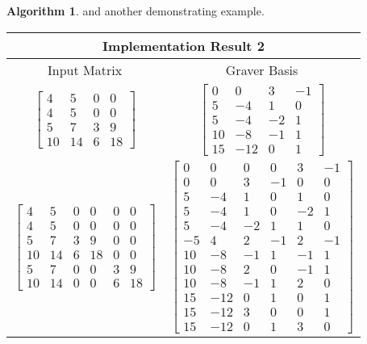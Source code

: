\documentclass{article}
\theoremstyle{plain}
\theoremstyle{definition}
\newtheorem{algorithm}[theorem]{Algorithm}
\begin{document}
\begin{algorithm}
and another demonstrating example.

\begin{center}
\begin{tabular}{ |c|c| }
\hline
\multicolumn{2}{|c|}{Implementation Result 2} \\
\hline
 Input Matrix &Graver Basis \\
 \hline
 $
\left[\begin{array}{cccc}
4 & 5 & 0 & 0 
\\
 4 & 5 & 0 & 0 
\\
 5 & 7 & 3 & 9 
\\
 10 & 14 & 6 & 18 
\end{array}\right]$   &  $ \left[\begin{array}{cccc}
0 & 0 & 3 & -1 
\\
 5 & -4 & 1 & 0 
\\
 5 & -4 & -2 & 1 
\\
 10 & -8 & -1 & 1 
\\
 15 & -12 & 0 & 1 
\end{array}\right] $ \\
\hline 
$\left[\begin{array}{cccccc}
4 & 5 & 0 & 0 & 0 & 0 
\\
 4 & 5 & 0 & 0 & 0 & 0 
\\
 5 & 7 & 3 & 9 & 0 & 0 
\\
 10 & 14 & 6 & 18 & 0 & 0 
\\
 5 & 7 & 0 & 0 & 3 & 9 
\\
 10 & 14 & 0 & 0 & 6 & 18 
\end{array}\right]$ & $\left[\begin{array}{cccccc}
0 & 0 & 0 & 0 & 3 & -1 
\\
 0 & 0 & 3 & -1 & 0 & 0 
\\
 5 & -4 & 1 & 0 & 1 & 0 
\\
 5 & -4 & 1 & 0 & -2 & 1 
\\
 5 & -4 & -2 & 1 & 1 & 0 
\\
 -5 & 4 & 2 & -1 & 2 & -1 
\\
 10 & -8 & -1 & 1 & -1 & 1 
\\
 10 & -8 & 2 & 0 & -1 & 1 
\\
 10 & -8 & -1 & 1 & 2 & 0 
\\
 15 & -12 & 0 & 1 & 0 & 1 
\\
 15 & -12 & 3 & 0 & 0 & 1 
\\
 15 & -12 & 0 & 1 & 3 & 0 
\end{array}\right]$     \\
\hline
\end{tabular}
\end{center}


\end{algorithm}
\end{document}
